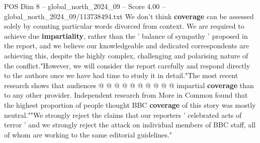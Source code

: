 \begin{textsample}{POS Dim 8 – global\_north\_2024\_09 – Score 4.00 – global\_north\_2024\_09/113738494.txt}
We don't think \textbf{coverage} can be assessed solely by counting particular words divorced from context.
We are required to achieve due \textbf{impartiality}, rather than the ' balance of sympathy ' proposed in the report, and we believe our knowledgeable and dedicated correspondents are achieving this, despite the highly complex, challenging and polarising nature of the conflict."However, we will consider the report carefully and respond directly to the authors once we have had time to study it in detail."The most recent research shows that audiences @ @ @ @ @ @ @ @ @ @ impartial \textbf{coverage} than to any other provider.
Independent research from More in Common found that the highest proportion of people thought BBC \textbf{coverage} of this story was mostly neutral.""We strongly reject the claims that our reporters ' celebrated acts of terror ' and we strongly reject the attack on individual members of BBC staff, all of whom are working to the same editorial guidelines."

\end{textsample}
